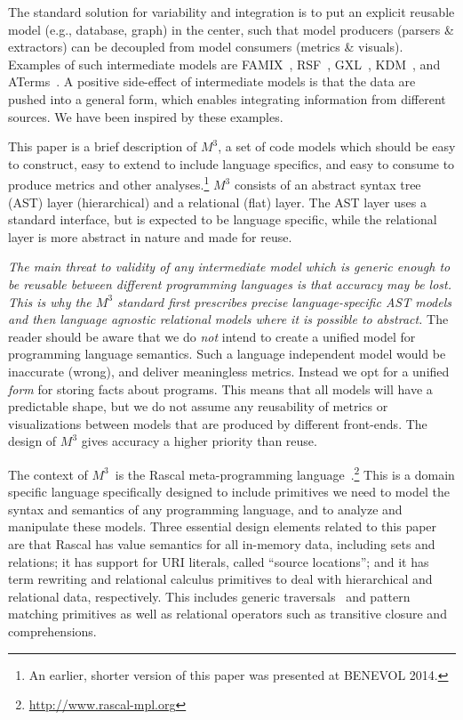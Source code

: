 \documentclass[conference]{IEEEtran}
\newcommand{\mthree}{\ensuremath{M^3}\xspace}
\begin{document}
The standard solution for variability and integration is to put an explicit
reusable model (e.g., database, graph) in the center, such that model
producers (parsers \& extractors) can be decoupled from model consumers
(metrics \& visuals). Examples of such intermediate models are
FAMIX~\cite{famix}, RSF~\cite{Mueller88}, GXL~\cite{HWS00}, KDM~\cite{omg-kdm},
and ATerms~\cite{BJKO00}. A positive side-effect of intermediate models
is that the data are pushed into a general form, which enables integrating
information from different sources. We have been inspired by these examples.

This paper is a brief description of \mthree, a set of code models which
should be easy to construct, easy to extend to include language specifics, and
easy to consume to produce metrics and other analyses.\!\footnote{An earlier,
shorter version of this paper was presented at BENEVOL 2014.} \mthree consists of an abstract syntax tree (AST) layer
(hierarchical) and a relational (flat) layer. The AST layer uses a standard
interface, but is expected to be language specific, while the relational layer
is more abstract in nature and made for reuse.

\emph{The main threat to validity of any intermediate model which is generic
enough to be reusable between different programming languages is that accuracy
may be lost. This is why the \mthree standard first prescribes precise
language-specific AST models and then language agnostic relational models
where it is possible to abstract.} The reader should be aware that we do
\emph{not} intend to create a unified model for programming language
semantics. Such a language independent model would be inaccurate (wrong), and
deliver meaningless metrics. Instead we opt for a unified \emph{form} for
storing facts about programs. This means that all models will have a
predictable shape, but we do not assume any reusability of metrics or
visualizations between models that are produced by different front-ends. The
design of \mthree  gives accuracy a higher priority than reuse.



The context of \mthree\ is the Rascal meta-programming language~\cite{KvdSV-
Rascal11,rascalscam}.\footnote{\url{http://www.rascal-mpl.org}} This is a
domain specific language specifically designed to include primitives we need
to model the syntax and semantics of any programming language, and to analyze
and manipulate these models. Three essential design elements related to this
paper are that Rascal has value semantics for all in-memory data, including
sets and relations; it has support for URI literals, called ``source
locations''; and it has term rewriting and relational calculus primitives to
deal with hierarchical and relational data, respectively. This includes
generic traversals~\cite{Traversals} and pattern matching primitives as well
as relational operators such as transitive closure and comprehensions.
\end{document}
